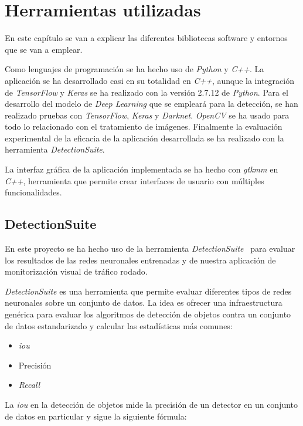 \chapter{Herramientas utilizadas}\label{cap.herramientas}
En este capítulo se van a explicar las diferentes bibliotecas software y entornos que se van a emplear.

Como lenguajes de programación se ha hecho uso de \textit{Python} y \textit{C++}. La aplicación se ha desarrollado casi en su totalidad en \textit{C++}, aunque la integración de \textit{TensorFlow} y \textit{Keras} se ha realizado con la versión 2.7.12 de \textit{Python}.
Para el desarrollo del modelo de \textit{Deep Learning} que se empleará para la detección, se han realizado pruebas con \textit{TensorFlow}, \textit{Keras} y \textit{Darknet}. \textit{OpenCV} se ha usado para todo lo relacionado con el tratamiento de imágenes. Finalmente la evaluación experimental de la eficacia de la aplicación desarrollada se ha realizado con la herramienta \textit{DetectionSuite}.

La interfaz gráfica de la aplicación implementada se ha hecho con \textit{gtkmm} en \textit{C++}, herramienta que permite crear interfaces de usuario con múltiples funcionalidades.



\section{DetectionSuite}
En este proyecto se ha hecho uso de la herramienta \textit{DetectionSuite}~\cite{detectionsuite} para evaluar los resultados de las redes neuronales entrenadas y de nuestra aplicación de monitorización visual de tráfico rodado.

\textit{DetectionSuite} es una herramienta que permite evaluar diferentes tipos de redes neuronales sobre un conjunto de datos. La idea es ofrecer una infraestructura genérica para evaluar los algoritmos de detección de objetos contra un conjunto de datos estandarizado y calcular las estadísticas más comunes:
\begin{itemize}
    \item \textit{\acrfull{iou}}
    \item Precisión
    \item \textit{Recall}
\end{itemize}

La \textit{\acrfull{iou}} en la detección de objetos mide la precisión de un detector en un conjunto de datos en particular y sigue la siguiente fórmula:

